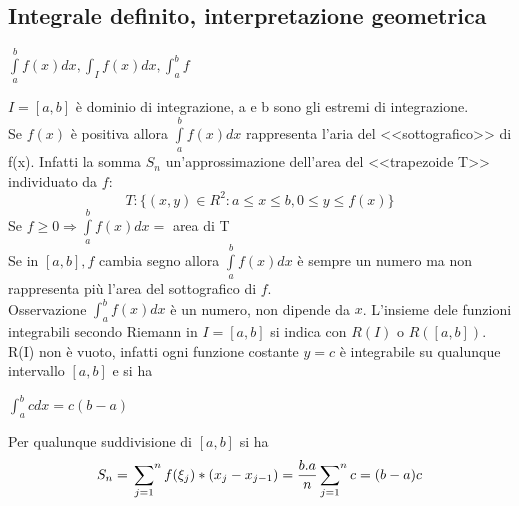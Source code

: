 \subsection{Integrale definito, interpretazione geometrica}
\begin{center}
	$\int\limits^b_af(x)dx, \int_If(x)dx,\int^b_af$
\end{center}
$I=[a,b]$ è dominio di integrazione, a e b sono gli estremi di integrazione.\\
Se $f(x)$ è positiva allora $\int\limits^b_a f(x)dx$ rappresenta l'aria del <<sottografico>> di f(x). Infatti la somma $S_n$ un'approssimazione dell'area del <<trapezoide T>> individuato da $f$:
\begin{equation*}
	T: \{(x,y)\in R^2: a\leq x\leq b, 0\leq y\leq f(x)\}
\end{equation*}
Se $f\geq 0\Rightarrow \int\limits_a^b f(x)dx=$ area di T\\
Se in $[a,b], f$ cambia segno allora $\int\limits^b_a f(x)dx$ è sempre un numero ma non rappresenta più l'area del sottografico di $f$.\\
Osservazione $\int^b_af(x)dx$ è un numero, non dipende da $x$. L'insieme dele funzioni integrabili secondo Riemann in $I=[a,b]$ si indica con $R(I)$ o $R([a,b])$.\\
R(I) non è vuoto, infatti ogni funzione costante $y=c$ è integrabile su qualunque intervallo $[a,b]$ e si ha
\begin{center}
	$\int^b_a c dx=c(b-a)$
\end{center}
Per qualunque suddivisione di $[a,b]$ si ha
\begin{equation*}
	S_n=\sideset{}{^n}\sum_{j=1}f(\xi_j)*(x_j-x_{j-1})=\frac{b.a}{n}\sideset{}{^n}\sum_{j=1}c=(b-a)c
\end{equation*}
